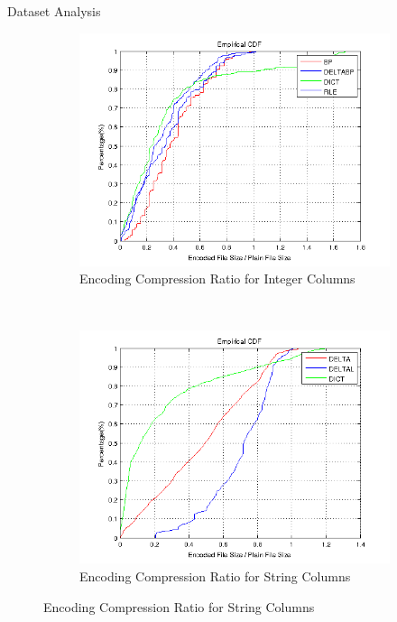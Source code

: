\documentclass{beamer}
\newlength{\onecolwid}
\begin{document}
\begin{frame}[t]
\begin{columns}[t]
\begin{column}{\onecolwid}
\begin{block}{Dataset Analysis}
\begin{figure}
\begin{subfigure}{0.5\textwidth}
\includegraphics[scale=1.2]{img/integer_cdf}
\caption{Encoding Compression Ratio for Integer Columns}
\end{subfigure}~
\begin{subfigure}{0.5\textwidth}
\includegraphics[scale=1.2]{img/string_cdf}
\caption{Encoding Compression Ratio for String Columns}
\end{subfigure}
\end{figure}


\end{block}
\end{column}
\end{columns}
\end{frame}
\end{document}
